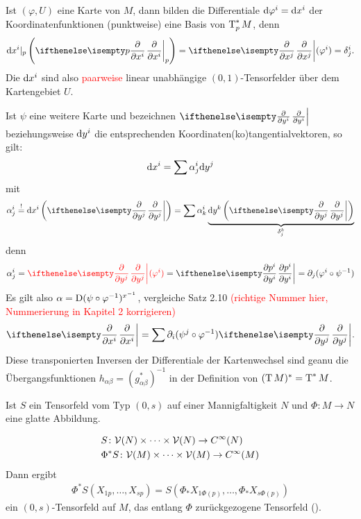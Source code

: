 Ist $(\varphi, U)$ eine Karte von $M$, dann bilden die Differentiale $\mathrm{d} \varphi^i = \mathrm{d} x^i$ der Koordinatenfunktionen (punktweise) eine Basis von $\operatorname{T}_p^{*}M$, denn
\begin{align*}
  \dop x^i|_p\left(\pdifffrac[p]{}{x^i}\right) = \pdifffrac{}{x^j}(\varphi^i) = \delta_j^i.
\end{align*}
Die $\mathrm{d} x^i$ sind also \textcolor{red}{paarweise} linear unabhängige $(0,1)$-Tensorfelder über dem Kartengebiet $U$.

Ist $\psi$ eine weitere Karte und bezeichnen $\pdifffrac{}{y^i}$ beziehungsweise $\mathrm{d} y^i$ die entsprechenden Koordinaten(ko)tangentialvektoren, so gilt:
	\[ \mathrm{d} x^i = \sum \alpha_j^i\mathrm{d} y^j \]
mit
	\[ \alpha_j^i \overset{!}{=} \dop x^i\left(\pdifffrac{}{y^j}\right) = \sum \alpha_k^i \underbrace{\dop y^k\left(\pdifffrac{}{y^j}\right)}_{\delta_j^k} \]
denn
	\[ \alpha_j^i = \textcolor{red}{\pdifffrac{}{y^j}(\varphi^i)} = \pdifffrac{p^i}{y^i} = \partial_j(\varphi^i\circ \psi^{-1}) \]
Es gilt also $\alpha = \operatorname{D}(\psi \circ \varphi^{-1})^{x^{-1}}$, vergleiche Satz 2.10 \textcolor{red}{(richtige Nummer hier, Nummerierung in Kapitel 2 korrigieren)}
\begin{align*}
  \pdifffrac{}{x^i} = \sum \partial_i (\psi^j \circ \varphi^{-1})\pdifffrac{}{y^j}.
\end{align*}
Diese transponierten Inversen der Differentiale der Kartenwechsel sind geanu die Übergangsfunktionen $h_{\alpha\beta} = (g_{\alpha\beta}^{*})^{-1}$ in der Definition von $(\operatorname{T} M)^{*} = \operatorname{T}^{*}M$.

Ist $S$ ein Tensorfeld vom Typ $(0,s)$ auf einer Mannigfaltigkeit $N$ und $\Phi \colon M \to N$ eine glatte Abbildung.
\begin{center}\end{center}
\begin{align*}
  & S \colon \mathcal V(N) \times \cdots \times \mathcal V(N) \to C^{\infty}(N)\\
  & \Phi^{*}S \colon \mathcal V(M) \times \cdots \times \mathcal V(M) \to C^{\infty}(M)
\end{align*}
Dann ergibt
\begin{align*}
  \Phi^{*}S(X_{1p},\ldots,X_{sp}) = S(\Phi_{*}X_{1\Phi(p)},\ldots,\Phi_{*}X_{s\Phi(p)})
\end{align*}
ein $(0,s)$-Tensorfeld auf $M$, das entlang $\Phi$ zurückgezogene Tensorfeld ().

